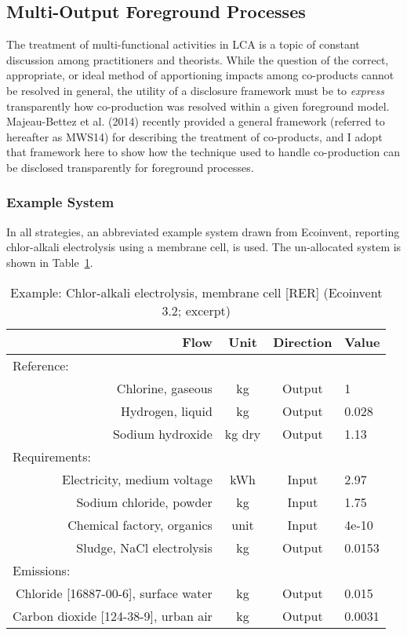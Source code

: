 \subsection{Multi-Output Foreground Processes}

The treatment of multi-functional activities in LCA is a topic of constant discussion among practitioners and theorists.  While the question of the correct, appropriate, or ideal method of apportioning impacts among co-products cannot be resolved in general, the utility of a disclosure framework must be to \textit{express} transparently how co-production was resolved within a given foreground model.  Majeau-Bettez et al. (2014) recently provided a general framework (referred to hereafter as MWS14) for describing the treatment of co-products, and I adopt that framework here to show how the technique used to handle co-production can be disclosed transparently for foreground processes.

\subsubsection{Example System}

In all strategies, an abbreviated example system drawn from Ecoinvent, reporting chlor-alkali electrolysis using a membrane cell, is used.  The un-allocated system is shown in Table~\ref{tbl:chlor-alkali}.

\begin{table}
  \begin{center}
  \caption{Example: Chlor-alkali electrolysis, membrane cell [RER] (Ecoinvent 3.2; excerpt)}
  \label{tbl:chlor-alkali}
  \begin{tabular}{rccl}
    \toprule
    \bf Flow & \bf Unit & \bf Direction & \bf Value \\
    \midrule
    \multicolumn{4}{l}{Reference:} \\
    Chlorine, gaseous & kg & Output & 1 \\
    Hydrogen, liquid & kg & Output & 0.028 \\
    Sodium hydroxide & kg dry & Output & 1.13 \\
    \midrule
    \multicolumn{4}{l}{Requirements:} \\
    Electricity, medium voltage & kWh & Input & 2.97 \\
    Sodium chloride, powder & kg & Input & 1.75 \\
    Chemical factory, organics & unit & Input & 4e-10 \\
    Sludge, NaCl electrolysis & kg & Output & 0.0153 \\[1ex]
    \multicolumn{4}{l}{Emissions:} \\
    Chloride [16887-00-6], surface water & kg & Output & 0.015 \\
    Carbon dioxide [124-38-9], urban air & kg & Output & 0.0031 \\
    \bottomrule
  \end{tabular}
  \end{center}
\end{table}

